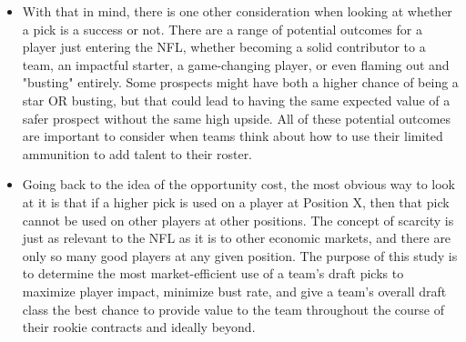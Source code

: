 \documentclass{article}
\begin{document}
\begin{itemize}
    \item With that in mind, there is one other consideration when looking at whether a pick is a success or not. There are a range of potential outcomes for a player just entering the NFL, whether becoming a solid contributor to a team, an impactful starter, a game-changing player, or even flaming out and "busting" entirely. Some prospects might have both a higher chance of being a star OR busting, but that could lead to having the same expected value of a safer prospect without the same high upside. All of these potential outcomes are important to consider when teams think about how to use their limited ammunition to add talent to their roster.
    \item Going back to the idea of the opportunity cost, the most obvious way to look at it is that if a higher pick is used on a player at Position X, then that pick cannot be used on other players at other positions. The concept of scarcity is just as relevant to the NFL as it is to other economic markets, and there are only so many good players at any given position. The purpose of this study is to determine the most market-efficient use of a team's draft picks to maximize player impact, minimize bust rate, and give a team's overall draft class the best chance to provide value to the team throughout the course of their rookie contracts and ideally beyond.
\end{itemize}
\end{document}

